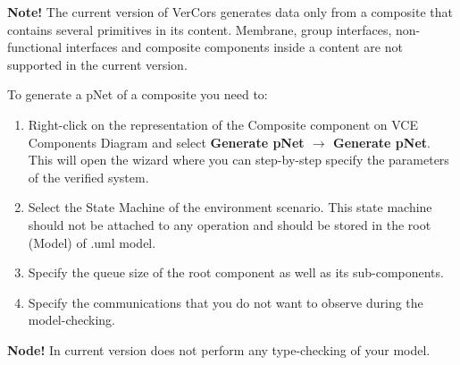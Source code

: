 \documentclass[12pt]{article}
\begin{document}
\textbf{Note! } The current version of VerCors generates data only from a composite that contains several primitives in its content. Membrane, group interfaces, non-functional interfaces and composite components inside a content are not supported in the current version.

To generate a pNet of a composite you need to:
\begin{enumerate}
\item
Right-click on the representation of the Composite component on VCE Components Diagram and select \textbf{Generate pNet $\rightarrow$ Generate pNet}. This will open the wizard where you can step-by-step specify the parameters of the verified system.
\item
Select the State Machine of the environment scenario. This state machine should not be attached to any operation and should be stored in the root (Model) of .uml model.
\item
Specify the queue size of the root component as well as its sub-components.
\item
Specify the communications that you do not want to observe during the model-checking.
\end{enumerate}

\textbf{Node! } In current version does not perform any type-checking of your model.
\end{document}
